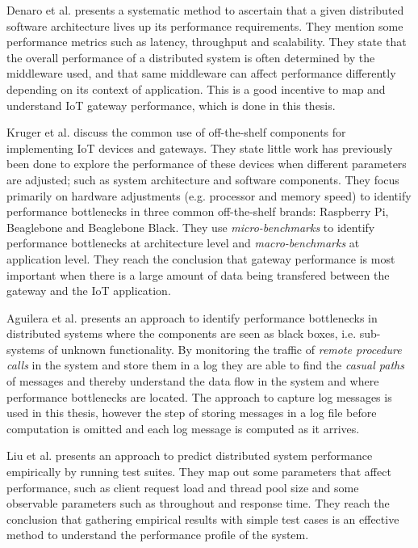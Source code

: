 Denaro et al. \cite{denaro2005performance} presents a systematic method to
ascertain that a given distributed software architecture lives up its
performance requirements. They mention some performance metrics such as
latency, throughput and scalability. They state that the overall performance of
a distributed system is often determined by the middleware used, and that same
middleware can affect performance differently depending on its context of
application. This is a good incentive to map and understand IoT gateway
performance, which is done in this thesis.

Kruger et al. \cite{kruger2014benchmarking} discuss the common use of
off-the-shelf components for implementing IoT devices and gateways. They state
little work has previously been done to explore the performance of these
devices when different parameters are adjusted; such as system architecture and
software components. They focus primarily on hardware adjustments (e.g.
processor and memory speed) to identify performance bottlenecks in three common
off-the-shelf brands: Raspberry Pi, Beaglebone and Beaglebone Black. They use
\textit{micro-benchmarks} to identify performance bottlenecks at architecture
level and \textit{macro-benchmarks} at application level. They reach the
conclusion that gateway performance is most important when there is a large
amount of data being transfered between the gateway and the IoT application.

Aguilera et al. \cite{aguilera2003performance} presents an approach to identify
performance bottlenecks in distributed systems where the components are seen as
black boxes, i.e. sub-systems of unknown functionality. By monitoring the
traffic of \textit{remote procedure calls} in the system and store them in a
log they are able to find the \textit{casual paths} of messages and thereby
understand the data flow in the system and where performance bottlenecks are
located. The approach to capture log messages is used in this thesis, however
the step of storing messages in a log file before computation is omitted and
each log message is computed as it arrives.

Liu et al. \cite{liu2002designing} presents an approach to predict distributed
system performance empirically by running test suites. They map out some
parameters that affect performance, such as client request load and thread pool
size and some observable parameters such as throughout and response time. They
reach the conclusion that gathering empirical results with simple test cases is
an effective method to understand the performance profile of the system.

